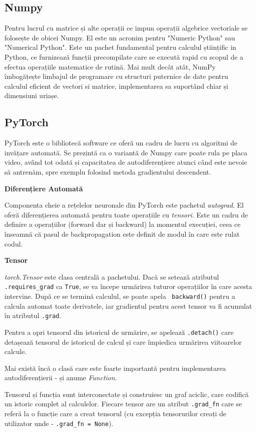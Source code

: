 \subsection{Numpy}

Pentru lucrul cu matrice și alte operații ce impun operații algebrice vectoriale se folosește de obicei Numpy. El este un acronim pentru "Numeric Python" sau "Numerical Python". Este un pachet fundamental pentru calculul științific in Python, ce furnizează funcții precompilate care se execută rapid cu scopul de a efectua operațiile matematice de rutină.  Mai mult decât atât, NumPy îmbogățește limbajul de programare cu structuri puternice de date pentru calculul eficient de vectori si matrice, implementarea sa suportând chiar și dimensiuni uriașe.

\subsection{PyTorch}

PyTorch \cite{pytorch} este o bibliotecă software ce oferă un cadru de lucru cu algoritmi de invățare automată. Se prezintă ca o variantă de Numpy care poate rula pe placa video, având tot odată și capacitatea de autodiferențiere atunci când este nevoie să antrenăm, spre exemplu folosind metoda gradientului descendent.

\textbf{Diferențiere Automată}

Componenta cheie a rețelelor neuronale din PyTorch este pachetul \textit{autograd}. El oferă diferențierea automată pentru toate operațiile cu \textit{tensori}. Este un cadru de definire a operațiilor (forward dar și backward) la momentul execuției, ceea ce înseamnă că pasul de backpropagation este definit de modul în care este rulat codul.

\textbf{Tensor}

\textit{torch.Tensor} este clasa centrală a pachetului. Dacă se setează atributul \texttt{.requires\_grad} ca  \texttt{True}, se va începe urmărirea tuturor operațiilor în care acesta intervine. După ce se termină calculul, se poate apela \texttt{ backward()} pentru a calcula automat toate derivatele, iar gradientul pentru acest tensor va fi acumulat în atributul \texttt{.grad}.

Pentru a opri tensorul din istoricul de urmărire, se apelează \texttt{.detach()} care detașează tensorul de istoricul de calcul și care împiedica urmărirea viitoarelor calcule.

Mai există încă o clasă care este foarte importantă pentru implementarea autodiferențierii - și anume \textit{Function}.

Tensorul și funcția sunt interconectate și construiesc un graf aciclic, care codifică un istoric complet al calculelor. Fiecare tensor are un atribut  \texttt{.grad\_fn} care se referă la o funcție care a creat tensorul (cu excepția tensorurilor creați de utilizator unde - \texttt{.grad\_fn = None}).